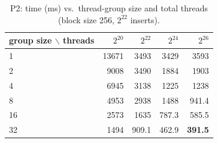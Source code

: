 \begin{table}[H]\centering\small
\caption{P2: time (ms) vs.\ thread-group size and total threads (block size 256, $2^{22}$ inserts).}\label{tab:p2group}
\begin{tabular}{lrrrr}
\toprule
group size $\backslash$ threads & $2^{20}$ & $2^{22}$ & $2^{24}$ & $2^{26}$ \\
\midrule
1 & 13671 & 3493 & 3429 & 3593 \\
2 & 9008 & 3490 & 1884 & 1903 \\
4 & 6945 & 3138 & 1225 & 1238 \\
8 & 4953 & 2938 & 1488 & 941.4 \\
16 & 2573 & 1635 & 787.3 & 585.5 \\
32 & 1494 & 909.1 & 462.9 & \textbf{391.5} \\
\bottomrule
\end{tabular}
\end{table}
